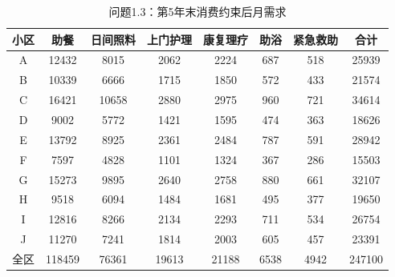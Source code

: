 \begin{table}[h]
\centering
\caption{问题1.3：第5年末消费约束后月需求}
\begin{tabular}{|c|c|c|c|c|c|c|c|}
\hline
小区 & 助餐 & 日间照料 & 上门护理 & 康复理疗 & 助浴 & 紧急救助 & 合计 \\
\hline
A & 12432 & 8015 & 2062 & 2224 & 687 & 518 & 25939 \\
B & 10339 & 6666 & 1715 & 1850 & 572 & 433 & 21574 \\
C & 16421 & 10658 & 2880 & 2975 & 960 & 721 & 34614 \\
D & 9002 & 5772 & 1421 & 1595 & 474 & 363 & 18626 \\
E & 13792 & 8925 & 2361 & 2484 & 787 & 591 & 28942 \\
F & 7597 & 4828 & 1101 & 1324 & 367 & 286 & 15503 \\
G & 15273 & 9895 & 2640 & 2758 & 880 & 661 & 32107 \\
H & 9518 & 6094 & 1484 & 1681 & 495 & 377 & 19650 \\
I & 12816 & 8266 & 2134 & 2293 & 711 & 534 & 26754 \\
J & 11270 & 7241 & 1814 & 2003 & 605 & 457 & 23391 \\
全区 & 118459 & 76361 & 19613 & 21188 & 6538 & 4942 & 247100 \\
\hline
\end{tabular}
\end{table}
